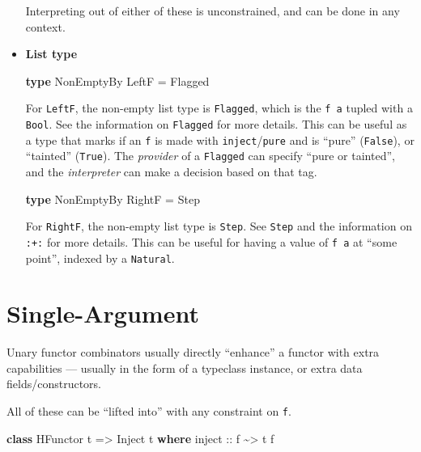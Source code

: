 \documentclass[]{article}
\newenvironment{Shaded}{}{}
\newcommand{\DataTypeTok}[1]{\textcolor[rgb]{0.56,0.13,0.00}{#1}}
\newcommand{\KeywordTok}[1]{\textcolor[rgb]{0.00,0.44,0.13}{\textbf{#1}}}
\newcommand{\NormalTok}[1]{#1}
\newcommand{\OperatorTok}[1]{\textcolor[rgb]{0.40,0.40,0.40}{#1}}
\newcommand{\OtherTok}[1]{\textcolor[rgb]{0.00,0.44,0.13}{#1}}
\begin{document}
\begin{itemize}
  Interpreting out of either of these is unconstrained, and can be done in any
  context.
\item
  \textbf{List type}

\begin{Shaded}
\begin{Highlighting}[]
\KeywordTok{type} \DataTypeTok{NonEmptyBy} \DataTypeTok{LeftF} \OtherTok{=} \DataTypeTok{Flagged}
\end{Highlighting}
\end{Shaded}

  For \texttt{LeftF}, the non-empty list type is \texttt{Flagged}, which is the
  \texttt{f\ a} tupled with a \texttt{Bool}. See the information on
  \texttt{Flagged} for more details. This can be useful as a type that marks if
  an \texttt{f} is made with \texttt{inject}/\texttt{pure} and is ``pure''
  (\texttt{False}), or ``tainted'' (\texttt{True}). The \emph{provider} of a
  \texttt{Flagged} can specify ``pure or tainted'', and the \emph{interpreter}
  can make a decision based on that tag.

\begin{Shaded}
\begin{Highlighting}[]
\KeywordTok{type} \DataTypeTok{NonEmptyBy} \DataTypeTok{RightF} \OtherTok{=} \DataTypeTok{Step}
\end{Highlighting}
\end{Shaded}

  For \texttt{RightF}, the non-empty list type is \texttt{Step}. See
  \texttt{Step} and the information on \texttt{:+:} for more details. This can
  be useful for having a value of \texttt{f\ a} at ``some point'', indexed by a
  \texttt{Natural}.
\end{itemize}

\section{Single-Argument}\label{single-argument}

Unary functor combinators usually directly ``enhance'' a functor with extra
capabilities --- usually in the form of a typeclass instance, or extra data
fields/constructors.

All of these can be ``lifted into'' with any constraint on \texttt{f}.

\begin{Shaded}
\begin{Highlighting}[]
\KeywordTok{class} \DataTypeTok{HFunctor}\NormalTok{ t }\OtherTok{=\textgreater{}} \DataTypeTok{Inject}\NormalTok{ t }\KeywordTok{where}
\OtherTok{    inject ::}\NormalTok{ f }\OperatorTok{\textasciitilde{}\textgreater{}}\NormalTok{ t f}
\end{Highlighting}
\end{Shaded}
\end{document}
